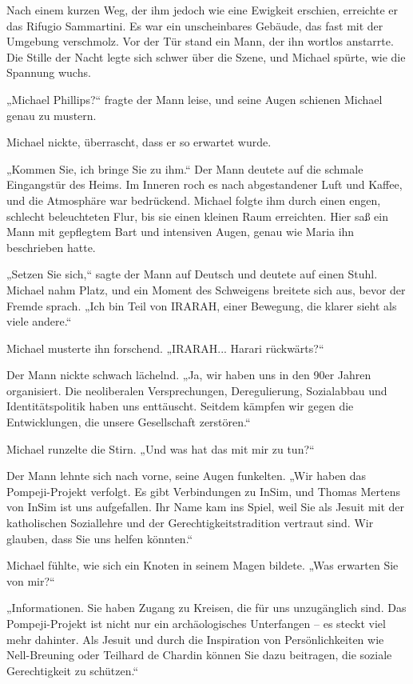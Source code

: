 \documentclass[
]{article}
\begin{document}
Nach einem kurzen Weg, der ihm jedoch wie eine Ewigkeit erschien,
erreichte er das Rifugio Sammartini. Es war ein unscheinbares Gebäude,
das fast mit der Umgebung verschmolz. Vor der Tür stand ein Mann, der
ihn wortlos anstarrte. Die Stille der Nacht legte sich schwer über die
Szene, und Michael spürte, wie die Spannung wuchs.

„Michael Phillips?{\kern0pt}`` fragte der Mann leise, und seine Augen
schienen Michael genau zu mustern.

Michael nickte, überrascht, dass er so erwartet wurde.

„Kommen Sie, ich bringe Sie zu ihm.`` Der Mann deutete auf die schmale
Eingangstür des Heims. Im Inneren roch es nach abgestandener Luft und
Kaffee, und die Atmosphäre war bedrückend. Michael folgte ihm durch
einen engen, schlecht beleuchteten Flur, bis sie einen kleinen Raum
erreichten. Hier saß ein Mann mit gepflegtem Bart und intensiven Augen,
genau wie Maria ihn beschrieben hatte.

„Setzen Sie sich,`` sagte der Mann auf Deutsch und deutete auf einen
Stuhl. Michael nahm Platz, und ein Moment des Schweigens breitete sich
aus, bevor der Fremde sprach. „Ich bin Teil von IRARAH, einer Bewegung,
die klarer sieht als viele andere.``

Michael musterte ihn forschend. „IRARAH... Harari rückwärts?{\kern0pt}``

Der Mann nickte schwach lächelnd. „Ja, wir haben uns in den 90er Jahren
organisiert. Die neoliberalen Versprechungen, Deregulierung, Sozialabbau
und Identitätspolitik haben uns enttäuscht. Seitdem kämpfen wir gegen
die Entwicklungen, die unsere Gesellschaft zerstören.``

Michael runzelte die Stirn. „Und was hat das mit mir zu tun?{\kern0pt}``

Der Mann lehnte sich nach vorne, seine Augen funkelten. „Wir haben das
Pompeji-Projekt verfolgt. Es gibt Verbindungen zu InSim, und Thomas
Mertens von InSim ist uns aufgefallen. Ihr Name kam ins Spiel, weil Sie
als Jesuit mit der katholischen Soziallehre und der
Gerechtigkeitstradition vertraut sind. Wir glauben, dass Sie uns helfen
könnten.``

Michael fühlte, wie sich ein Knoten in seinem Magen bildete. „Was
erwarten Sie von mir?{\kern0pt}``

„Informationen. Sie haben Zugang zu Kreisen, die für uns unzugänglich
sind. Das Pompeji-Projekt ist nicht nur ein archäologisches Unterfangen
-- es steckt viel mehr dahinter. Als Jesuit und durch die Inspiration
von Persönlichkeiten wie Nell-Breuning oder Teilhard de Chardin können
Sie dazu beitragen, die soziale Gerechtigkeit zu schützen.``
\end{document}
